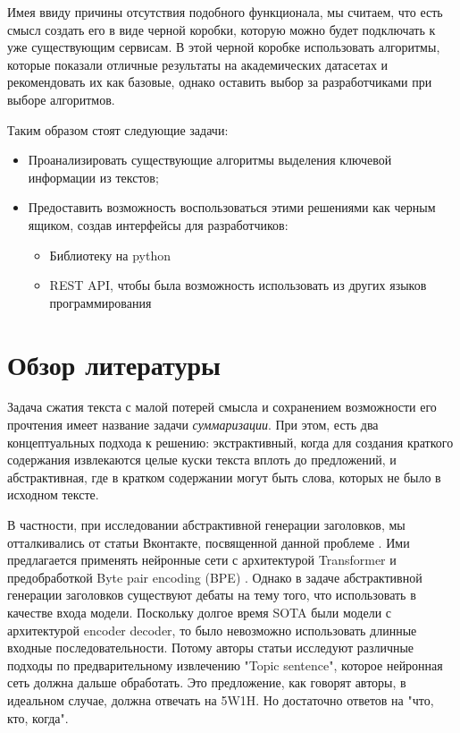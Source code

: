 \documentclass[14pt]{matmex-diploma-custom}
\begin{document}
Имея ввиду причины отсутствия подобного функционала, мы считаем, что есть смысл создать его в виде
черной коробки, которую можно будет подключать к уже существующим сервисам. В этой черной коробке
использовать алгоритмы, которые показали отличные результаты на академических датасетах и рекомендовать их как базовые, однако оставить выбор за разработчиками при выборе алгоритмов.

Таким образом стоят следующие задачи:

\begin{itemize}
  \item Проанализировать существующие алгоритмы выделения ключевой информации из текстов;
  \item Предоставить возможность воспользоваться этими решениями как черным ящиком, создав интерфейсы для разработчиков:
  \begin{itemize}
    \item Библиотеку на python
    \item REST API, чтобы была возможность использовать из других языков программирования
  \end{itemize}
\end{itemize}

\section{Обзор литературы}
Задача сжатия текста с малой потерей смысла и сохранением возможности его прочтения
имеет название задачи \textit{суммаризации}. При этом, есть два концептуальных подхода к решению:
экстрактивный, когда для создания краткого содержания извлекаются целые куски текста вплоть до предложений,
и абстрактивная, где в кратком содержании могут быть слова, которых не было в исходном тексте.

В частности, при исследовании абстрактивной генерации заголовков, мы отталкивались от статьи Вконтакте, посвященной данной проблеме \cite{gavrilov2018self}. Ими предлагается применять нейронные сети с архитектурой Transformer и предобработкой Byte pair encoding (BPE) \cite{DBLP:journals/corr/SennrichHB15}. Однако в задаче абстрактивной генерации заголовков существуют дебаты на тему того, что использовать в качестве входа модели. Поскольку долгое время SOTA были модели с архитектурой encoder decoder, то было невозможно использовать длинные входные последовательности. Потому авторы статьи \cite{Putra2018IncorporatingTS} исследуют различные подходы по предварительному извлечению "Topic sentence", которое нейронная сеть должна дальше обработать. Это предложение, как говорят авторы, в идеальном случае, должна отвечать на 5W1H. Но достаточно ответов на "что, кто, когда".
\end{document}
